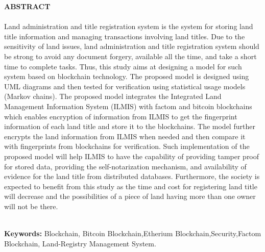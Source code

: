 \begin{center}
\thispagestyle{empty}
\vspace{2cm}
\LARGE{\textbf{ABSTRACT}}\\[1.0cm]
\end{center}
\thispagestyle{empty}
\large{\paragraph{}
Land administration  and  title registration  system is the  system for  storing  land title  information  and  managing transactions involving land titles. Due to the sensitivity of land issues, land administration  and  title  registration system should be strong to avoid any document forgery, available all the time, and take a short time to complete tasks. Thus, this study aims at designing a model for such system based on blockchain technology. The proposed model is  designed using  UML  diagrams  and then tested for verification using statistical  usage models (Markov chains).  The  proposed  model  integrates  the  Integrated  Land  Management  Information  System  (ILMIS)  with factom  and  bitcoin  blockchains  which  enables  encryption  of  information  from  ILMIS  to  get  the  fingerprint information of  each  land title  and  store it  to  the  blockchains.  The  model further  encrypts  the  land information from  ILMIS  when  needed  and  then  compare  it  with  fingerprints  from  blockchains  for  verification.  Such implementation  of  the  proposed  model  will help  ILMIS  to  have the  capability  of  providing  tamper  proof  for stored  data,  providing  the  self-notarization  mechanism,  and  availability  of  evidence  for  the  land  title  from distributed  databases.  Furthermore,  the society  is  expected  to  benefit from this  study  as  the time  and cost  for registering land title will decrease and the possibilities of a piece of land having more than one owner will not be there. \\
}
\textbf{ \Large{ \\ Keywords:} } Blockchain, Bitcoin Blockchain,Etherium Blockchain,Security,Factom Blockchain, Land-Registry Management System.